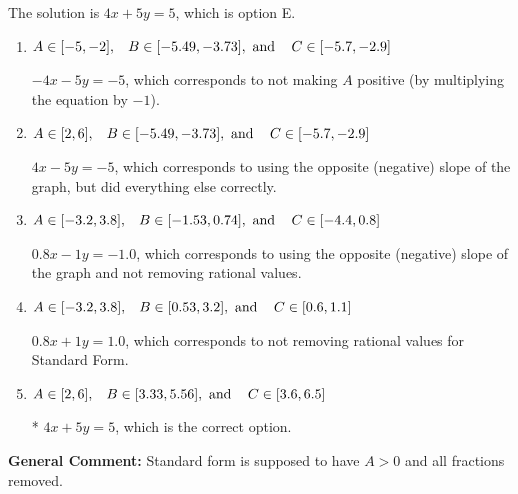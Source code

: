\documentclass{extbook}[14pt]
\begin{document}
\begin{enumerate}
{The solution is \( 4x + 5y = 5 \), which is option E.\begin{enumerate}[label=\Alph*.]
\item \( A \in [-5, -2], \hspace{3mm} B \in [-5.49, -3.73], \text{ and } \hspace{3mm} C \in [-5.7, -2.9] \)

 $-4x - 5y = -5$, which corresponds to not making $A$ positive (by multiplying the equation by $-1$).
\item \( A \in [2, 6], \hspace{3mm} B \in [-5.49, -3.73], \text{ and } \hspace{3mm} C \in [-5.7, -2.9] \)

 $4x - 5y = -5$, which corresponds to using the opposite (negative) slope of the graph, but did everything else correctly.
\item \( A \in [-3.2, 3.8], \hspace{3mm} B \in [-1.53, 0.74], \text{ and } \hspace{3mm} C \in [-4.4, 0.8] \)

 $0.8x - 1y = -1.0$, which corresponds to using the opposite (negative) slope of the graph and not removing rational values.
\item \( A \in [-3.2, 3.8], \hspace{3mm} B \in [0.53, 3.2], \text{ and } \hspace{3mm} C \in [0.6, 1.1] \)

 $0.8x + 1y = 1.0$, which corresponds to not removing rational values for Standard Form.
\item \( A \in [2, 6], \hspace{3mm} B \in [3.33, 5.56], \text{ and } \hspace{3mm} C \in [3.6, 6.5] \)

* $4x + 5y = 5$, which is the correct option.
\end{enumerate}

\textbf{General Comment:} Standard form is supposed to have $A > 0$ and all fractions removed.
}
\end{enumerate}
\end{document}
